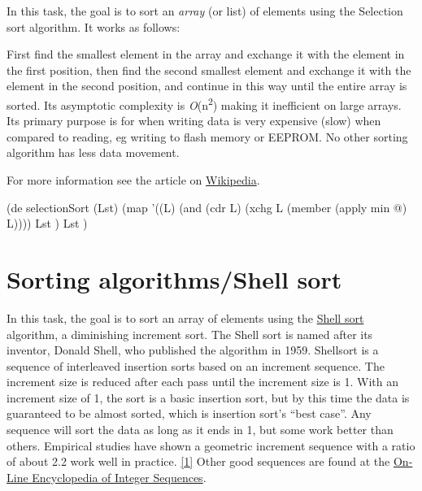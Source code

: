 In this task, the goal is to sort an \emph{array} (or list)
of elements using the Selection sort algorithm. It works as follows:

First find the smallest element in the array and exchange it with the
element in the first position, then find the second smallest element and
exchange it with the element in the second position, and continue in
this way until the entire array is sorted. Its asymptotic complexity is
\emph{O}(n\textsuperscript{2}) making it inefficient on large
arrays. Its primary purpose is for when writing data is very expensive
(slow) when compared to reading, eg writing to flash memory or EEPROM.
No other sorting algorithm has less data movement.

For more information see the article on
\href{http://en.wikipedia.org/wiki/Selection\_sort}{Wikipedia}.

\begin{wideverbatim}

(de selectionSort (Lst)
   (map
      '((L) (and (cdr L) (xchg L (member (apply min @) L))))
      Lst )
   Lst )

\end{wideverbatim}

\pagebreak{}
\section*{Sorting algorithms/Shell sort}

In this task, the goal is to sort an array of elements using the
\href{http://en.wikipedia.org/wiki/Shell\_sort}{Shell sort} algorithm, a
diminishing increment sort. The Shell sort is named after its inventor,
Donald Shell, who published the algorithm in 1959. Shellsort is a
sequence of interleaved insertion sorts based on an increment sequence.
The increment size is reduced after each pass until the increment size
is 1. With an increment size of 1, the sort is a basic insertion sort,
but by this time the data is guaranteed to be almost sorted, which is
insertion sort's ``best case''. Any sequence will sort the data as long
as it ends in 1, but some work better than others. Empirical studies
have shown a geometric increment sequence with a ratio of about 2.2 work
well in practice. \href{http://www.cs.princeton.edu/~rs/shell/}{{[}1{]}}
Other good sequences are found at the
\href{https://oeis.org/search?q=shell+sort}{On-Line Encyclopedia of
Integer Sequences}.

